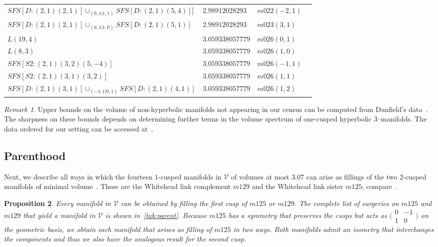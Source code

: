\documentclass[a4paper]{gtart}
\newtheorem{proposition}{Proposition}[section]
\theoremstyle{definition}
\theoremstyle{remark}
\newtheorem{remark}[proposition]{Remark}
\numberwithin{equation}{section}
\begin{document}
\begin{center}
\begin{longtable}{llll}
		$SFS [D: (2,1) (2,1)] \cup_{(0,1 | 1,1)} SFS [D: (2,1) (5,4)] ]	$ & $2.98912028293$ & $m022(-2, 1)	$ &  \\
		$SFS [D: (2,1) (2,1)] \cup_{(0,1 | 1,0)} SFS [D: (2,1) (5,1)]$ & $2.98912028293$ & $m023(3, 1)$ &  \\
			\midrule
		$L(19,4)$ & $3.059338057779$ & $m026(0, 1)$ & \\
		$L(8,3)$ & $3.059338057779$ & $m026(1, 0)$ & \\
		$SFS [S2: (2,1) (3,2) (5,-4)]	$ & $3.059338057779$ & $m026(-1, 1)	$ &  \\
		$SFS [S2: (2,1) (3,1) (3,2)]	$ & $3.059338057779$ & $m026(1, 1)$ &  \\
		$SFS [D: (2,1) (3,1)] \cup_{(-1,1 | 0,1)} SFS [D: (2,1) (4,1)]$ & $3.059338057779$ & $m026(1, 2)$ &  \\
		\bottomrule
\end{longtable}
\end{center}

\begin{remark}
Upper bounds on the volume of non-hyperbolic manifolds not appearing in our census can be computed from Dunfield's data~\cite{Du20}. The sharpness on these bounds depends on determining further terms in the volume spectrum of one-cusped hyperbolic 3--manifolds. The data ordered for our setting can be accessed at~\cite{data}.
\end{remark}

\subsection{Parenthood}

Next, we describe all ways in which the fourteen $1$-cusped manifolds in $\mathcal{V}$ of volumes at most $3.07$ can arise as fillings of the two $2$-cusped manifolds of minimal volume~\cite{agol-2cusped}. These are the Whitehead link complement $m129$ and the Whitehead link sister $m125$; compare~.

\begin{proposition}
	\label{prop:isometry}
	Every manifold in $\mathcal{V}$ can be obtained by filling the first cusp of $m125$ or $m129$. The complete list of surgeries on $m125$ and $m129$ that yield a manifold in $\mathcal{V}$ is shown in~\cref{tab:parent}. Because $m125$ has a symmetry that preserves the cusps but acts as $\bigl(\begin{smallmatrix}0 & -1 \\ 1 & 0\end{smallmatrix}\bigr)$ on the geometric basis, we obtain each manifold that arises as filling of $m125$ in two ways. Both manifolds admit an isometry that interchanges the components and thus we also have the analogous result for the second cusp.
\end{proposition}
\end{document}
